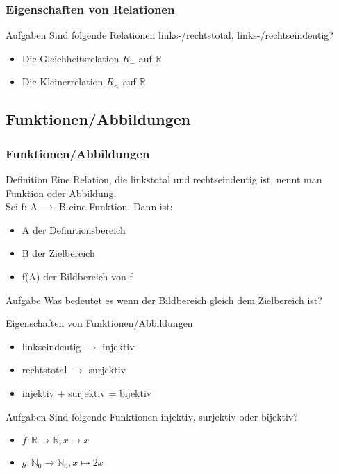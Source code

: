 \documentclass{beamer}
\begin{document}
\begin {frame}
	\frametitle{Eigenschaften von Relationen}
	 \begin{exampleblock}{Aufgaben}
		Sind folgende Relationen links-/rechtstotal, links-/rechtseindeutig?
		\begin{itemize}
			\item Die Gleichheitsrelation \(R_{=}\) auf $\mathbb R$
			\item Die Kleinerrelation \(R_{<}\) auf $\mathbb R$
		\end{itemize}
	\end{exampleblock}
\end{frame}

\subsection{Funktionen/Abbildungen}
\begin {frame}
	\frametitle{Funktionen/Abbildungen}
	\begin{block}{Definition}
		Eine Relation, die linkstotal und rechtseindeutig ist, nennt man Funktion oder Abbildung. \\
		Sei f: A $\rightarrow$ B eine Funktion. Dann ist:
		\begin{itemize}
			\item A der Definitionsbereich
			\item B der Zielbereich
			 \item f(A) der Bildbereich von f
		\end{itemize}
	\end{block}
	\begin{exampleblock}{Aufgabe}
		Was bedeutet es wenn der Bildbereich gleich dem Zielbereich ist?
	\end{exampleblock}
\end {frame}

\begin {frame}
	\begin{block}{Eigenschaften von Funktionen/Abbildungen}
		\begin{itemize}
			\item linkseindeutig $\rightarrow$ injektiv
			\item rechtstotal $\rightarrow$ surjektiv
			\item injektiv + surjektiv = bijektiv
		\end{itemize}
	\end{block}
	\begin{exampleblock}{Aufgaben}
		Sind folgende Funktionen injektiv, surjektiv oder bijektiv?
		\begin{itemize}
			\item \(f:\mathbb R \rightarrow \mathbb R, x \mapsto x\)
			\item \(g:\mathbb N_{0} \rightarrow \mathbb N_{0}, x \mapsto 2x\)
		\end{itemize}
	\end{exampleblock}
\end{frame}
\end{document}
